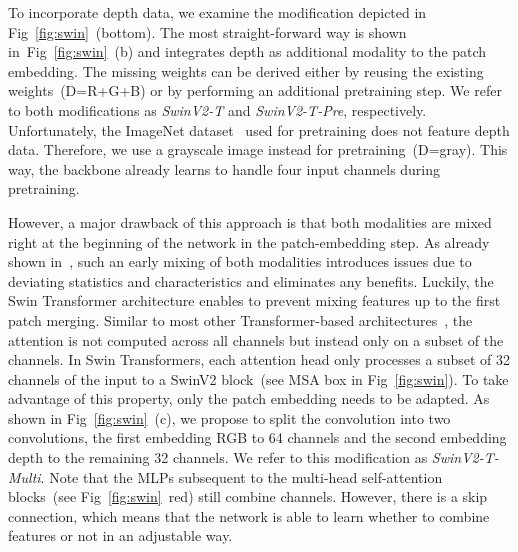\documentclass[conference]{IEEEtran}
\begin{document}
To incorporate depth data, we examine the modification depicted in Fig~\ref{fig:swin}~(bottom).
The most straight-forward way is shown in~Fig~\ref{fig:swin}~(b) and integrates depth as additional modality to the patch embedding.
The missing weights can be derived either by reusing the existing weights~(D=R+G+B) or by performing an additional pretraining step. 
We refer to both modifications as \emph{SwinV2-T} and \emph{SwinV2-T-Pre}, respectively.
Unfortunately, the ImageNet dataset~\cite{ImageNet-ijcv2015} used for pretraining does not feature depth data. 
Therefore, we use a grayscale image instead for pretraining~(D=gray). 
This way, the backbone already learns to handle four input channels during pretraining.

However, a major drawback of this approach is that both modalities are mixed right at the beginning of the network in the patch-embedding step.
As already shown in~\cite{FuseNet-accv2016}, such an early mixing of both modalities introduces issues due to deviating statistics and characteristics and eliminates any benefits.
Luckily, the Swin Transformer architecture enables to prevent mixing features up to the first patch merging.
Similar to most other Transformer-based architectures~\cite{Transformer-neurips2017, gpt-neurips2017, vit-iclr2021}, the attention is not computed across all channels but instead only on a subset of the channels.
In Swin Transformers, each attention head only processes a subset of 32 channels of the input to a SwinV2 block~(see MSA box in Fig~\ref{fig:swin}).
To take advantage of this property, only the patch embedding needs to be adapted. 
As shown in Fig~\ref{fig:swin}~(c), we propose to split the  convolution into two convolutions, the first embedding RGB to 64 channels and the second embedding depth to the remaining 32 channels.
We refer to this modification as \emph{SwinV2-T-Multi}.
Note that the MLPs subsequent to the multi-head self-attention blocks~(see Fig~\ref{fig:swin}~red) still combine channels. 
However, there is a skip connection, which means that the network is able to learn whether to combine features or not in an adjustable way.
\end{document}
